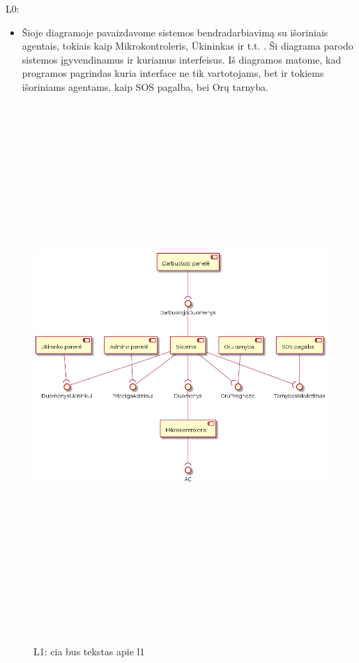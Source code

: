 \documentclass[oneside]{VUMIFPSkursinis}
\begin{document}
	\begin{itemize}
	\item L0:
	\begin{itemize}
	\item Šioje diagramoje pavaizdavome sistemos bendradarbiavimą su išoriniais agentais, tokiais kaip Mikrokontroleris, Ūkininkas ir t.t. . Ši diagrama parodo sistemos įgyvendinamus ir kuriamus interfeisus. Iš diagramos matome, kad programos pagrindas kuria interface ne tik vartotojams, bet ir tokiems išoriniams agentams, kaip SOS pagalba, bei Orų tarnyba.
\end{itemize}
	\begin{figure}[H]
		\centering	
	\includegraphics[width=17cm,height=20cm,keepaspectratio]{L1V2.png}
	\caption{}
	\label{fig:L1V2}

\item L1: cia bus tekstas apie l1

\end{figure}
\end{itemize}
\end{document}
